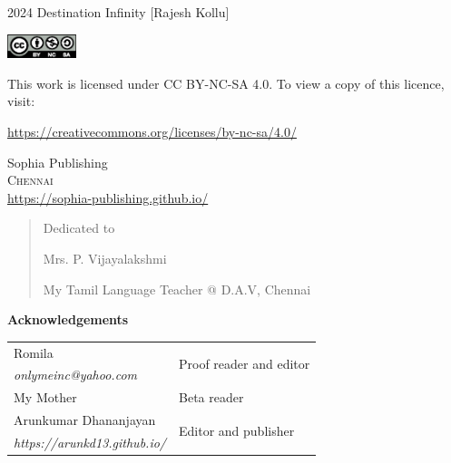 
\cleardoublepage

\begin{center}
\HUGE{\thetitle}
\end{center}
\cleardoublepage

\begin{center}
\HUGE{\thetitle}
\end{center}

\begin{center}
\LARGE{\theauthor}
\end{center}

\vfill

\begin{center}
    \sophia
\end{center}
\clearpage

\begingroup
\footnotesize
\setlength{\parindent}{0pt}
\setlength{\parskip}{\baselineskip}

\textcopyright{} 2024 Destination Infinity [Rajesh Kollu]

\includegraphics[height=20pt]{by-nc-sa.eps}

This work is licensed under CC BY-NC-SA 4.0. To view a copy of this licence,
visit:

\url{https://creativecommons.org/licenses/by-nc-sa/4.0/}

\vfill

Sophia Publishing \\
\textsc{Chennai} \\
\url{https://sophia-publishing.github.io/} \\
\endgroup

\clearpage

\begin{quote}
\begin{center}Dedicated to

\Large
Mrs. P. Vijayalakshmi
\normalsize

My Tamil Language Teacher @ D.A.V, Chennai
\end{center}
\end{quote}

\vfill

\textbf{Acknowledgements}

\footnotesize
\begin{tabular}{ll}
    Romila & \multirow{2}{*}{Proof reader and editor} \\
    \emph{onlymeinc@yahoo.com} & \\
    My Mother & Beta reader \\
    Arunkumar Dhananjayan & \multirow{2}{*}{Editor and publisher} \\
    \emph{https://arunkd13.github.io/} & \\
\end{tabular}

\clearpage